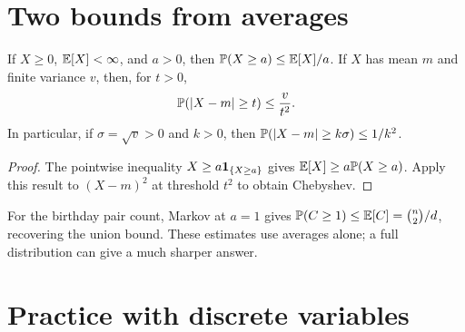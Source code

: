 \section{Two bounds from averages}
\label{sec:discrete-bounds}

\begin{theorem}
If $X\ge0$, $\E[X]<\infty$, and $a>0$, then
$\P(X\ge a)\le\E[X]/a$.
If $X$ has mean $m$ and finite variance $v$, then, for $t>0$,
\[
 \P(|X-m|\ge t)\le\frac{v}{t^2}.
\]
In particular, if $\sigma=\sqrt v>0$ and $k>0$, then
$\P(|X-m|\ge k\sigma)\le1/k^2$.
\end{theorem}
\begin{proof}
The pointwise inequality $X\ge a\ind_{\{X\ge a\}}$ gives
$\E[X]\ge a\P(X\ge a)$.
Apply this result to $(X-m)^2$ at threshold $t^2$ to obtain Chebyshev.
\end{proof}
For the birthday pair count, Markov at $a=1$ gives
$\P(C\ge1)\le\E[C]=\binom n2/d$, recovering the union bound.
These estimates use averages alone; a full distribution can give a
much sharper answer.

\section{Practice with discrete variables}
\label{sec:discrete-moments-exercises}

